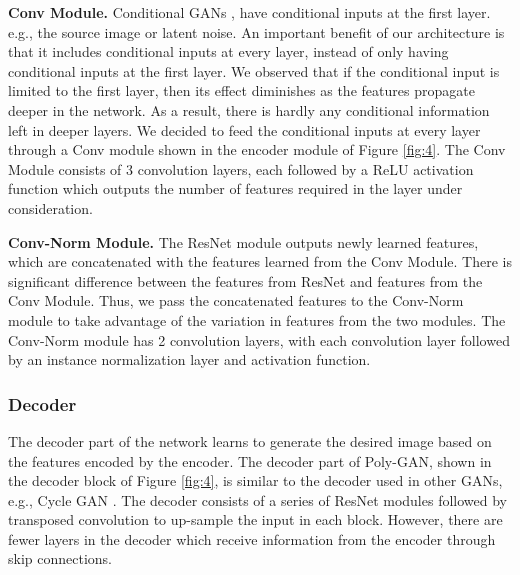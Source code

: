 \documentclass[11pt]{article}
\begin{document}
\textbf{Conv Module.}
Conditional GANs \citet{ConGAN}, \citet{InfoGAN} 
have conditional inputs at the first layer. e.g., the source image or latent noise. 
An important benefit of our architecture is that it includes conditional inputs at every layer, instead of only having conditional inputs at the first layer. 
We observed that if the conditional input is limited to the first layer, then its effect diminishes as the features propagate deeper in the network. As a result, there is hardly any conditional information left in deeper layers. 
We decided to feed the conditional inputs at every layer through a Conv module shown in the encoder module of Figure \ref{fig:4}. 
The Conv Module consists of 3 convolution layers, each followed by a ReLU activation function which outputs the number of features required in the layer under consideration.

\textbf{Conv-Norm Module.}
The ResNet module outputs newly learned features, which are concatenated with the features learned from the Conv Module. There is significant difference between the features from ResNet and features from the Conv Module. 
Thus, we pass the concatenated features to the Conv-Norm module to take advantage of the variation in features from the two modules. 
The Conv-Norm module has 2 convolution layers, with each convolution layer followed by an instance normalization layer and activation function.

\subsubsection{Decoder}
The decoder part of the network learns to generate the desired image based on the features encoded by the encoder. 
The decoder part of Poly-GAN, shown in the decoder block of Figure \ref{fig:4}, is similar to the decoder used in other GANs, e.g., Cycle GAN \citet{CycleGAN}. 
The decoder consists of a series of ResNet modules followed by transposed convolution to up-sample the input in each block.
However, there are fewer layers in the decoder which receive information from the encoder through skip connections.
\end{document}
